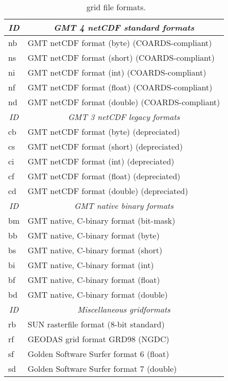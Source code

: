 \begin{table}[H]
\centering
\begin{tabular}{|l|l|} \hline
\multicolumn{1}{|c|}{\emph{ID}}	&	\multicolumn{1}{c|}{\emph{GMT 4 netCDF standard formats}} \\ \hline \hline
nb & GMT netCDF format (byte)   (COARDS-compliant)		\\ \hline
ns & GMT netCDF format (short)  (COARDS-compliant)		\\ \hline
ni & GMT netCDF format (int)    (COARDS-compliant)		\\ \hline
nf & GMT netCDF format (float)  (COARDS-compliant)		\\ \hline
nd & GMT netCDF format (double) (COARDS-compliant) 		\\ \hline \hline
\multicolumn{1}{|c|}{\emph{ID}}	&	\multicolumn{1}{c|}{\emph{GMT 3 netCDF legacy formats}} \\ \hline \hline
cb & GMT netCDF format (byte)	(depreciated) \\ \hline
cs & GMT netCDF format (short)	(depreciated) \\ \hline
ci & GMT netCDF format (int)	(depreciated) \\ \hline
cf & GMT netCDF format (float)	(depreciated) \\ \hline
cd & GMT netCDF format (double)	(depreciated) \\ \hline \hline
\multicolumn{1}{|c|}{\emph{ID}}	&	\multicolumn{1}{c|}{\emph{GMT native binary formats}} \\ \hline \hline
bm & GMT native, C-binary format (bit-mask)	\\ \hline
bb & GMT native, C-binary format (byte)		\\ \hline
bs & GMT native, C-binary format (short)	\\ \hline
bi & GMT native, C-binary format (int)		\\ \hline
bf & GMT native, C-binary format (float)	\\ \hline
bd & GMT native, C-binary format (double)	\\ \hline \hline
\multicolumn{1}{|c|}{\emph{ID}}	&	\multicolumn{1}{c|}{\emph{Miscellaneous gridformats}} \\ \hline \hline
rb & SUN rasterfile format (8-bit standard)	\\ \hline
rf & GEODAS grid format GRD98 (NGDC)		\\ \hline
sf & Golden Software Surfer format 6 (float)	\\ \hline
sd & Golden Software Surfer format 7 (double)	\\ \hline
\end{tabular}
\caption{\gmt\ grid file formats.}
\label{tbl:grdformats}
\end{table}

